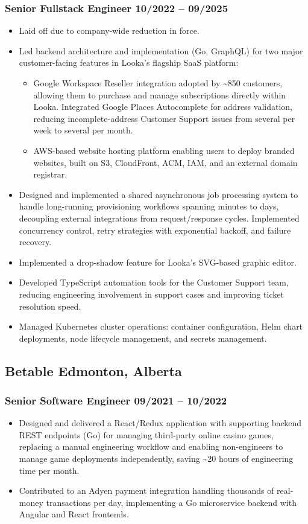 \documentclass[10pt]{article}
\begin{document}
\subsubsection{Senior Fullstack Engineer \hfill 10/2022 -- 09/2025}
\begin{itemize}
  \item Laid off due to company-wide reduction in force.
  \item Led backend architecture and implementation (Go, GraphQL) for two major customer-facing features in Looka's flagship SaaS platform:
    \begin{itemize}
      \item Google Workspace Reseller integration adopted by \textasciitilde850 customers, allowing them to purchase and manage subscriptions directly within Looka. Integrated Google Places Autocomplete for address validation, reducing incomplete-address Customer Support issues from several per week to several per month.
      \item AWS-based website hosting platform enabling users to deploy branded websites, built on S3, CloudFront, ACM, IAM, and an external domain registrar.
    \end{itemize}
  \item Designed and implemented a shared asynchronous job processing system to handle long-running provisioning workflows spanning minutes to days, decoupling external integrations from request/response cycles. Implemented concurrency control, retry strategies with exponential backoff, and failure recovery.
  \item Implemented a drop-shadow feature for Looka's SVG-based graphic editor.
  \item Developed TypeScript automation tools for the Customer Support team, reducing engineering involvement in support cases and improving ticket resolution speed.
  \item Managed Kubernetes cluster operations: container configuration, Helm chart deployments, node lifecycle management, and secrets management.
\end{itemize}

\subsection{Betable \hfill Edmonton, Alberta}
\subsubsection{Senior Software Engineer \hfill 09/2021 -- 10/2022}
\begin{itemize}
  \item Designed and delivered a React/Redux application with supporting backend REST endpoints (Go) for managing third-party online casino games, replacing a manual engineering workflow and enabling non-engineers to manage game deployments independently, saving \textasciitilde20 hours of engineering time per month.
  \item Contributed to an Adyen payment integration handling thousands of real-money transactions per day, implementing a Go microservice backend with Angular and React frontends.
\end{itemize}
\end{document}
